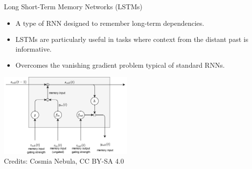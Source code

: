 \documentclass[aspectratio=169]{../latex_main/tntbeamer}  %
\begin{document}
        \begin{frame}{Long Short-Term Memory Networks (LSTMs)}
        \begin{itemize}
            \item A type of RNN designed to remember long-term dependencies.
            \item LSTMs are particularly useful in tasks where context from the distant past is informative.
            \item Overcomes the vanishing gradient problem typical of standard RNNs.
        \end{itemize}
        \centering
        \includegraphics[width=0.5\textwidth]{figures/lstm.png}\\
        Credits: Cosmia Nebula, CC BY-SA 4.0
        \end{frame}

\end{document}
